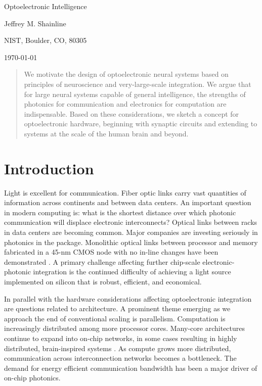 \documentclass[twocolumn]{article}
\begin{document}
	
	\centerline{\LARGE Optoelectronic Intelligence}%
	\vspace{0.75em}
	\centerline{\Large Jeffrey M. Shainline}
	\vspace{0.5em}
	\centerline{\large NIST, Boulder, CO, 80305}
	\vspace{0.5em}
	\centerline{\large \today}
	
\begin{abstract}
We motivate the design of optoelectronic neural systems based on principles of neuroscience and very-large-scale integration. We argue that for large neural systems capable of general intelligence, the strengths of photonics for communication and electronics for computation are indispensable. Based on these considerations, we sketch a concept for optoelectronic hardware, beginning with synaptic circuits and extending to systems at the scale of the human brain and beyond.
\end{abstract}

\section{\label{sec:introduction}Introduction}
Light is excellent for communication. Fiber optic links carry vast quantities of information across continents and between data centers. An important question in modern computing is: what is the shortest distance over which photonic communication will displace electronic interconnects? Optical links between racks in data centers are becoming common. Major companies are investing seriously in photonics in the package. Monolithic optical links between processor and memory fabricated in a 45-nm CMOS node with no in-line changes have been demonstrated \cite{suwa2015}. A primary challenge affecting further chip-scale electronic-photonic integration is the continued difficulty of achieving a light source implemented on silicon that is robust, efficient, and economical.

In parallel with the hardware considerations affecting optoelectronic integration are questions related to architecture. A prominent theme emerging as we approach the end of conventional scaling is parallelism. Computation is increasingly distributed among more processor cores. Many-core architectures continue to expand into on-chip networks, in some cases resulting in highly distributed, brain-inspired systems \cite{bo2000,pfgr2013,mear2014,fuga2014,payu2017,dasr2018}. As compute grows more distributed, communication across interconnection networks becomes a bottleneck. The demand for energy efficient communication bandwidth has been a major driver of on-chip photonics.
\end{document}
